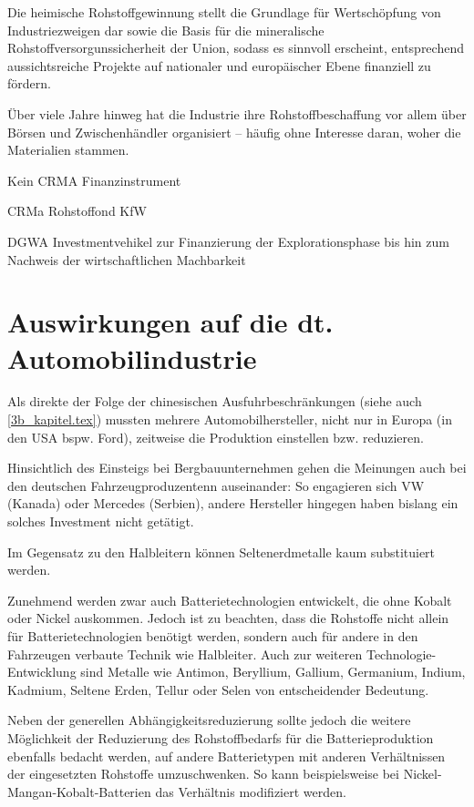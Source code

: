 \documentclass[12pt,a4paper,oneside]{book} %
\begin{document}
Die heimische Rohstoffgewinnung stellt die Grundlage für Wertschöpfung von Industriezweigen dar sowie die Basis für die mineralische Rohstoffversorgunssicherheit der Union, sodass es sinnvoll erscheint, entsprechend aussichtsreiche Projekte auf nationaler und europäischer Ebene finanziell zu fördern.\autocite{Commodity Top News 73, S. 14}

Über viele Jahre hinweg hat die Industrie ihre Rohstoffbeschaffung vor allem über Börsen und Zwischenhändler organisiert – häufig ohne Interesse daran, woher die Materialien stammen.\autocite{https://www.africa-business-guide.de/de/praxis/erfahrungen/schluesselrolle-afrikas-bedeutung-bei-den-kritischen-rohstoffen--1920084} 

Kein CRMA Finanzinstrument

CRMa Rohstoffond KfW

DGWA Investmentvehikel zur Finanzierung der Explorationsphase bis hin zum Nachweis der wirtschaftlichen Machbarkeit

\section{Auswirkungen auf die dt. Automobilindustrie}



Als direkte der Folge der chinesischen Ausfuhrbeschränkungen (siehe auch \ref{3b_kapitel.tex}) mussten mehrere Automobilhersteller, nicht nur in Europa (in den USA bspw. Ford\autocite{Naughton_Bloomberg}), zeitweise die Produktion einstellen bzw. reduzieren.

Hinsichtlich des Einsteigs bei Bergbauunternehmen gehen die Meinungen auch bei den deutschen Fahrzeugproduzentenn auseinander: So engagieren sich VW (Kanada) oder Mercedes (Serbien), andere Hersteller hingegen haben bislang ein solches Investment nicht getätigt.

Im Gegensatz zu den Halbleitern können Seltenerdmetalle kaum substituiert werden.

Zunehmend werden zwar auch Batterietechnologien entwickelt, die ohne Kobalt oder Nickel auskommen. Jedoch ist zu beachten, dass die Rohstoffe nicht allein für Batterietechnologien benötigt werden, sondern auch für andere in den Fahrzeugen verbaute Technik wie Halbleiter. Auch zur weiteren Technologie-Entwicklung sind Metalle wie Antimon, Beryllium, Gallium, Germanium, Indium, Kadmium, Seltene Erden, Tellur oder Selen von entscheidender Bedeutung.\autocite{Commodity Top News 73, S. 3}

Neben der generellen Abhängigkeitsreduzierung sollte jedoch die weitere Möglichkeit der Reduzierung des Rohstoffbedarfs für die Batterieproduktion ebenfalls bedacht werden, auf andere Batterietypen mit anderen Verhältnissen der eingesetzten Rohstoffe umzuschwenken. So kann beispielsweise bei Nickel-Mangan-Kobalt-Batterien das Verhältnis modifiziert werden.
\end{document}
